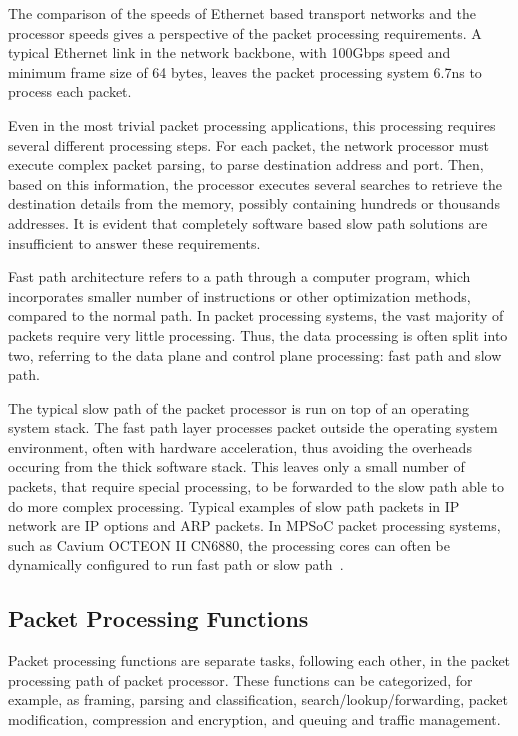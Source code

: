 The comparison of the speeds of Ethernet based transport networks and the processor speeds gives a perspective of the packet processing requirements. A typical Ethernet link in the network backbone, with 100Gbps speed and minimum frame size of 64 bytes, leaves the packet processing system 6.7ns to process each packet.~\cite{Giladi:2008:Network}

Even in the most trivial packet processing applications, this processing requires several different processing steps. For each packet, the network processor must execute complex packet parsing, to parse destination address and port. Then, based on this information, the processor executes several searches to retrieve the destination details from the memory, possibly containing hundreds or thousands addresses. It is evident that completely software based slow path solutions are insufficient to answer these requirements.~\cite{Giladi:2008:Network}

Fast path architecture refers to a path through a computer program, which incorporates smaller number of instructions or other optimization methods, compared to the normal path. In packet processing systems, the vast majority of packets require very little processing. Thus, the data processing is often split into two, referring to the data plane and control plane processing: fast path and slow path.~\cite{6wind:2016:FP, Giladi:2008:Network}

The typical slow path of the packet processor is run on top of an operating system stack. The fast path layer processes packet outside the operating system environment, often with hardware acceleration, thus avoiding the overheads occuring from the thick software stack. This leaves only a small number of packets, that require special processing, to be forwarded to the slow path able to do more complex processing. Typical examples of slow path packets in IP network are IP options and ARP packets. In MPSoC packet processing systems, such as Cavium OCTEON II CN6880, the processing cores can often be dynamically configured to run fast path or slow path~\cite{cavium:2010:fundamentals}.~\cite{6wind:2016:FP, Giladi:2008:Network}

\subsection{Packet Processing Functions}
Packet processing functions are separate tasks, following each other, in the packet processing path of packet processor. These functions can be categorized, for example, as framing, parsing and classification, search/lookup/forwarding, packet modification, compression and encryption, and queuing and traffic management.~\cite{Giladi:2008:Network}


